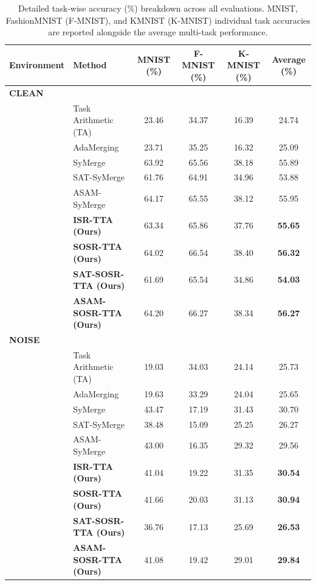 \documentclass{article}
\theoremstyle{plain}
\theoremstyle{definition}
\theoremstyle{remark}
\begin{document}
\begin{table}[t]
\caption{Detailed task-wise accuracy (\%) breakdown across all evaluations. MNIST, FashionMNIST (F-MNIST), and KMNIST (K-MNIST) individual task accuracies are reported alongside the average multi-task performance.}
\label{tab:appendix_detailed_results}
\vskip 0.15in
\begin{center}
\begin{small}
\begin{tabular}{llcccc}
\toprule
Environment & Method & MNIST (\%) & F-MNIST (\%) & K-MNIST (\%) & Average (\%) \\
\midrule
\textbf{CLEAN} & & & & & \\
 & \quad Task Arithmetic (TA) & 23.46 & 34.37 & 16.39 & 24.74 \\
 & \quad AdaMerging & 23.71 & 35.25 & 16.32 & 25.09 \\
 & \quad SyMerge & 63.92 & 65.56 & 38.18 & 55.89 \\
 & \quad SAT-SyMerge & 61.76 & 64.91 & 34.96 & 53.88 \\
 & \quad ASAM-SyMerge & 64.17 & 65.55 & 38.12 & 55.95 \\
 & \quad \textbf{ISR-TTA (Ours)} & 63.34 & 65.86 & 37.76 & \textbf{55.65} \\
 & \quad \textbf{SOSR-TTA (Ours)} & 64.02 & 66.54 & 38.40 & \textbf{56.32} \\
 & \quad \textbf{SAT-SOSR-TTA (Ours)} & 61.69 & 65.54 & 34.86 & \textbf{54.03} \\
 & \quad \textbf{ASAM-SOSR-TTA (Ours)} & 64.20 & 66.27 & 38.34 & \textbf{56.27} \\
\midrule
\textbf{NOISE} & & & & & \\
 & \quad Task Arithmetic (TA) & 19.03 & 34.03 & 24.14 & 25.73 \\
 & \quad AdaMerging & 19.63 & 33.29 & 24.04 & 25.65 \\
 & \quad SyMerge & 43.47 & 17.19 & 31.43 & 30.70 \\
 & \quad SAT-SyMerge & 38.48 & 15.09 & 25.25 & 26.27 \\
 & \quad ASAM-SyMerge & 43.00 & 16.35 & 29.32 & 29.56 \\
 & \quad \textbf{ISR-TTA (Ours)} & 41.04 & 19.22 & 31.35 & \textbf{30.54} \\
 & \quad \textbf{SOSR-TTA (Ours)} & 41.66 & 20.03 & 31.13 & \textbf{30.94} \\
 & \quad \textbf{SAT-SOSR-TTA (Ours)} & 36.76 & 17.13 & 25.69 & \textbf{26.53} \\
 & \quad \textbf{ASAM-SOSR-TTA (Ours)} & 41.08 & 19.42 & 29.01 & \textbf{29.84} \\

\end{tabular}
\end{small}
\end{center}
\end{table}
\end{document}
